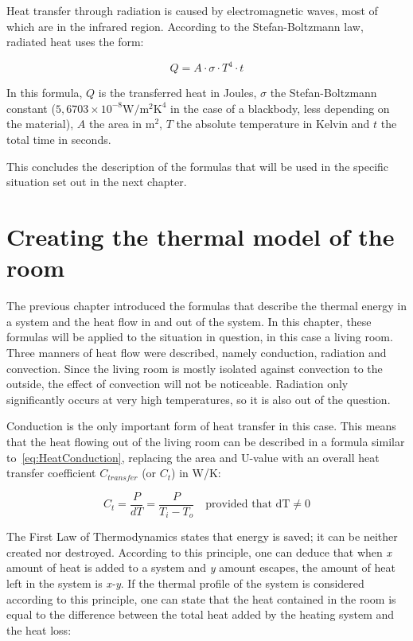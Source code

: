 \documentclass[12pt,a4paper,final]{report}
\begin{document}
Heat transfer through radiation is caused by electromagnetic waves, most of which are in the infrared region. According to the Stefan-Boltzmann law\cite{engineeringtoolbox14}, radiated heat uses the form:

\begin{equation} \label{eq:HeatRadiation}
Q = A\cdot \sigma \cdot{} T^{4} \cdot{} t
\end{equation}

In this formula, $Q$ is the transferred heat in Joules, $\sigma$ the Stefan-Boltzmann constant ($\mathrm{5,6703\times 10^{-8} W/m^{2}K^{4}}$ in the case of a blackbody, less depending on the material), $A$ the area in $\mathrm{m^{2}}$, $T$ the absolute temperature in Kelvin and $t$ the total time in seconds.

This concludes the description of the formulas that will be used in the specific situation set out in the next chapter.

\chapter{Creating the thermal model of the room} \label{chap:createModel}
The previous chapter introduced the formulas that describe the thermal energy in a system and the heat flow in and out of the system. In this chapter, these formulas will be applied to the situation in question, in this case a living room. Three manners of heat flow were described, namely conduction, radiation and convection. Since the living room is mostly isolated against convection to the outside, the effect of convection will not be noticeable. Radiation only significantly occurs at very high temperatures, so it is also out of the question. 

Conduction is the only important form of heat transfer in this case. This means that the heat flowing out of the living room can be described in a formula similar to~\eqref{eq:HeatConduction}, replacing the area and U-value with an overall heat transfer coefficient $C_{transfer}$ (or $C_{t}$) in W/K: 

\begin{equation} \label{eq:Ctransfer}
C_{t} = \frac{P}{dT} = \frac{P}{T_{i}-T_{o}} \quad \text{provided that $\mathrm{dT\neq{}0}$}
\end{equation}

The First Law of Thermodynamics states that energy is saved; it can be neither created nor destroyed\cite{Bodner1stTherm}. According to this principle, one can deduce that when \textit{x} amount of heat is added to a system and \textit{y} amount escapes, the amount of heat left in the system is \textit{x-y}. If the thermal profile of the system is considered according to this principle, one can state that the heat contained in the room is equal to the difference between the total heat added by the heating system and the heat loss:
\end{document}
